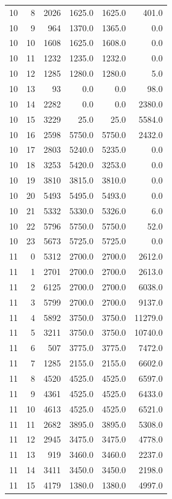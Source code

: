 \begin{longtable}{rrrrrr}
10 & 8 & 2026 & 1625.0 & 1625.0 & 401.0\\
10 & 9 & 964 & 1370.0 & 1365.0 & 0.0\\
10 & 10 & 1608 & 1625.0 & 1608.0 & 0.0\\
10 & 11 & 1232 & 1235.0 & 1232.0 & 0.0\\
10 & 12 & 1285 & 1280.0 & 1280.0 & 5.0\\
10 & 13 & 93 & 0.0 & 0.0 & 98.0\\
10 & 14 & 2282 & 0.0 & 0.0 & 2380.0\\
10 & 15 & 3229 & 25.0 & 25.0 & 5584.0\\
10 & 16 & 2598 & 5750.0 & 5750.0 & 2432.0\\
10 & 17 & 2803 & 5240.0 & 5235.0 & 0.0\\
10 & 18 & 3253 & 5420.0 & 3253.0 & 0.0\\
10 & 19 & 3810 & 3815.0 & 3810.0 & 0.0\\
10 & 20 & 5493 & 5495.0 & 5493.0 & 0.0\\
10 & 21 & 5332 & 5330.0 & 5326.0 & 6.0\\
10 & 22 & 5796 & 5750.0 & 5750.0 & 52.0\\
10 & 23 & 5673 & 5725.0 & 5725.0 & 0.0\\
11 & 0 & 5312 & 2700.0 & 2700.0 & 2612.0\\
11 & 1 & 2701 & 2700.0 & 2700.0 & 2613.0\\
11 & 2 & 6125 & 2700.0 & 2700.0 & 6038.0\\
11 & 3 & 5799 & 2700.0 & 2700.0 & 9137.0\\
11 & 4 & 5892 & 3750.0 & 3750.0 & 11279.0\\
11 & 5 & 3211 & 3750.0 & 3750.0 & 10740.0\\
11 & 6 & 507 & 3775.0 & 3775.0 & 7472.0\\
11 & 7 & 1285 & 2155.0 & 2155.0 & 6602.0\\
11 & 8 & 4520 & 4525.0 & 4525.0 & 6597.0\\
11 & 9 & 4361 & 4525.0 & 4525.0 & 6433.0\\
11 & 10 & 4613 & 4525.0 & 4525.0 & 6521.0\\
11 & 11 & 2682 & 3895.0 & 3895.0 & 5308.0\\
11 & 12 & 2945 & 3475.0 & 3475.0 & 4778.0\\
11 & 13 & 919 & 3460.0 & 3460.0 & 2237.0\\
11 & 14 & 3411 & 3450.0 & 3450.0 & 2198.0\\
11 & 15 & 4179 & 1380.0 & 1380.0 & 4997.0\\

\end{longtable}
